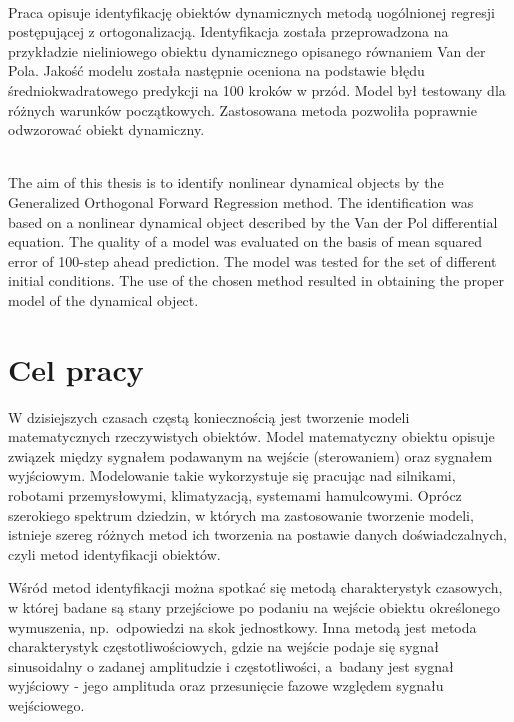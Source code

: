 



\renewcommand{\tablename}{Tabela}

\pagestyle{empty}
\stronatytulowa

\newpage
\setcounter{page}{1}

\newpage
\textbf{\tytulpl} \vspace*{0.2cm} \\
Praca opisuje identyfikację obiektów dynamicznych metodą uogólnionej regresji postępującej z ortogonalizacją. Identyfikacja została przeprowadzona na przykładzie nieliniowego obiektu dynamicznego opisanego równaniem Van der Pola. Jakość modelu została następnie oceniona na podstawie błędu średniokwadratowego predykcji na 100 kroków w przód. Model był testowany dla różnych warunków początkowych. Zastosowana metoda pozwoliła poprawnie odwzorować obiekt dynamiczny.

\vspace*{2cm}
\textbf{\tytulen} \vspace*{0.2cm} \\
The aim of this thesis is to identify nonlinear dynamical objects by the Generalized Orthogonal Forward Regression method. The identification was based on a nonlinear dynamical object described by the Van der Pol differential equation.  The quality of a model was evaluated on the basis of mean squared error of 100-step ahead prediction. The model was tested for the set of different initial conditions. The use of the chosen method resulted in obtaining the proper model of the dynamical object.

\newpage
\tableofcontents

\newpage
\pagestyle{plain}

\section{Cel pracy}
	W dzisiejszych czasach częstą koniecznością jest tworzenie modeli matematycznych rzeczywistych obiektów. Model matematyczny obiektu opisuje związek między sygnałem podawanym na wejście (sterowaniem) oraz sygnałem wyjściowym. Modelowanie takie wykorzystuje się pracując nad silnikami, robotami przemysłowymi, klimatyzacją, systemami hamulcowymi\cite{Isermann}. Oprócz szerokiego spektrum dziedzin, w których ma zastosowanie tworzenie modeli, istnieje szereg różnych metod ich tworzenia na postawie danych doświadczalnych, czyli metod identyfikacji obiektów.
	
	Wśród metod identyfikacji można spotkać się metodą charakterystyk czasowych, w której badane są stany przejściowe po podaniu na wejście obiektu określonego wymuszenia, np.~odpowiedzi na skok jednostkowy. Inna metodą jest metoda charakterystyk częstotliwościowych, gdzie na wejście podaje się sygnał sinusoidalny o zadanej amplitudzie i częstotliwości, a~badany jest sygnał wyjściowy - jego amplituda oraz przesunięcie fazowe względem sygnału wejściowego\cite{Czemplik}.
	
